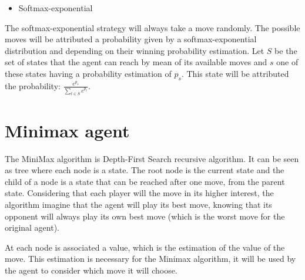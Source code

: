 \documentclass{article}
\newcommand\ddfrac[2]{\frac{\displaystyle #1}{\displaystyle #2}}
\begin{document}
\begin{itemize}
    \item Softmax-exponential
\end{itemize}

The softmax-exponential strategy will always take a move randomly. The possible moves will be attributed a probability given by a softmax-exponential distribution and depending on their winning probability estimation. Let $S$ be the set of states that the agent can reach by mean of its available moves and $s$ one of these states having a probability estimation of $p_{s}$. This state will be attributed the probability: $\ddfrac{e^{p_{s}}}{\sum_{t \in S}{e^{p_{t}}}}$.



\section{Minimax agent}
The MiniMax algorithm is Depth-First Search recursive algorithm. It can be seen as tree where each node is a state.
The root node is the current state and the child of a node is a state that can be reached after one move, from the parent state.
Considering that each player will the move in its higher interest, the algorithm imagine that the agent will play its best move, knowing that its opponent will always play its own best move (which is the worst move for the original agent).

At each node is associated a value, which is the estimation of the value of the move. This estimation is necessary for the Minimax algorithm, it will be used by the agent to consider which move it will choose.
\end{document}
